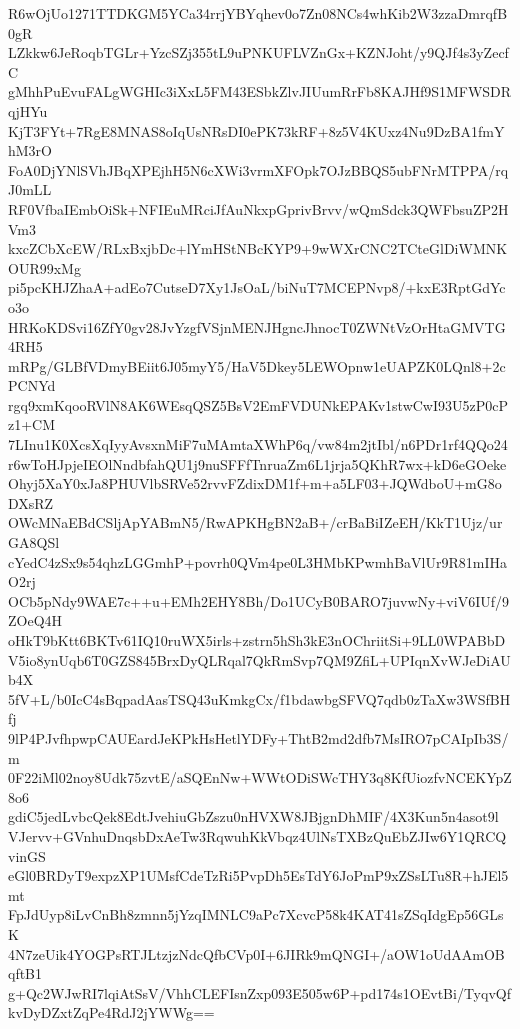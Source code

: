 R6wOjUo1271TTDKGM5YCa34rrjYBYqhev0o7Zn08NCs4whKib2W3zzaDmrqfB0gR
LZkkw6JeRoqbTGLr+YzcSZj355tL9uPNKUFLVZnGx+KZNJoht/y9QJf4s3yZecfC
gMhhPuEvuFALgWGHIc3iXxL5FM43ESbkZlvJIUumRrFb8KAJHf9S1MFWSDRqjHYu
KjT3FYt+7RgE8MNAS8oIqUsNRsDI0ePK73kRF+8z5V4KUxz4Nu9DzBA1fmYhM3rO
FoA0DjYNlSVhJBqXPEjhH5N6cXWi3vrmXFOpk7OJzBBQS5ubFNrMTPPA/rqJ0mLL
RF0VfbaIEmbOiSk+NFIEuMRciJfAuNkxpGprivBrvv/wQmSdck3QWFbsuZP2HVm3
kxcZCbXcEW/RLxBxjbDc+lYmHStNBcKYP9+9wWXrCNC2TCteGlDiWMNKOUR99xMg
pi5pcKHJZhaA+adEo7CutseD7Xy1JsOaL/biNuT7MCEPNvp8/+kxE3RptGdYco3o
HRKoKDSvi16ZfY0gv28JvYzgfVSjnMENJHgncJhnocT0ZWNtVzOrHtaGMVTG4RH5
mRPg/GLBfVDmyBEiit6J05myY5/HaV5Dkey5LEWOpnw1eUAPZK0LQnl8+2cPCNYd
rgq9xmKqooRVlN8AK6WEsqQSZ5BsV2EmFVDUNkEPAKv1stwCwI93U5zP0cPz1+CM
7LInu1K0XcsXqIyyAvsxnMiF7uMAmtaXWhP6q/vw84m2jtIbl/n6PDr1rf4QQo24
r6wToHJpjeIEOlNndbfahQU1j9nuSFFfTnruaZm6L1jrja5QKhR7wx+kD6eGOeke
Ohyj5XaY0xJa8PHUVlbSRVe52rvvFZdixDM1f+m+a5LF03+JQWdboU+mG8oDXsRZ
OWcMNaEBdCSljApYABmN5/RwAPKHgBN2aB+/crBaBiIZeEH/KkT1Ujz/urGA8QSl
cYedC4zSx9s54qhzLGGmhP+povrh0QVm4pe0L3HMbKPwmhBaVlUr9R81mIHaO2rj
OCb5pNdy9WAE7c++u+EMh2EHY8Bh/Do1UCyB0BARO7juvwNy+viV6IUf/9ZOeQ4H
oHkT9bKtt6BKTv61IQ10ruWX5irls+zstrn5hSh3kE3nOChriitSi+9LL0WPABbD
V5io8ynUqb6T0GZS845BrxDyQLRqal7QkRmSvp7QM9ZfiL+UPIqnXvWJeDiAUb4X
5fV+L/b0IcC4sBqpadAasTSQ43uKmkgCx/f1bdawbgSFVQ7qdb0zTaXw3WSfBHfj
9lP4PJvfhpwpCAUEardJeKPkHsHetlYDFy+ThtB2md2dfb7MsIRO7pCAIpIb3S/m
0F22iMl02noy8Udk75zvtE/aSQEnNw+WWtODiSWcTHY3q8KfUiozfvNCEKYpZ8o6
gdiC5jedLvbcQek8EdtJvehiuGbZszu0nHVXW8JBjgnDhMIF/4X3Kun5n4asot9l
VJervv+GVnhuDnqsbDxAeTw3RqwuhKkVbqz4UlNsTXBzQuEbZJIw6Y1QRCQvinGS
eGl0BRDyT9expzXP1UMsfCdeTzRi5PvpDh5EsTdY6JoPmP9xZSsLTu8R+hJEl5mt
FpJdUyp8iLvCnBh8zmnn5jYzqIMNLC9aPc7XcvcP58k4KAT41sZSqIdgEp56GLsK
4N7zeUik4YOGPsRTJLtzjzNdcQfbCVp0I+6JIRk9mQNGI+/aOW1oUdAAmOBqftB1
g+Qc2WJwRI7lqiAtSsV/VhhCLEFIsnZxp093E505w6P+pd174s1OEvtBi/TyqvQf
kvDyDZxtZqPe4RdJ2jYWWg==
